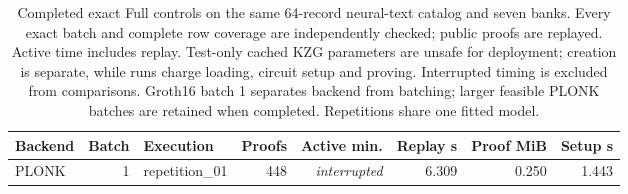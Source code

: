 \begin{table}[tbp]
\centering
\caption{Completed exact Full controls on the same 64-record neural-text catalog and seven banks. Every exact batch and complete row coverage are independently checked; public proofs are replayed. Active time includes replay. Test-only cached KZG parameters are unsafe for deployment; creation is separate, while runs charge loading, circuit setup and proving. Interrupted timing is excluded from comparisons. Groth16 batch 1 separates backend from batching; larger feasible PLONK batches are retained when completed. Repetitions share one fitted model.}
\label{tab:review-backend}
\begin{adjustbox}{max width=.98\textwidth,center=\textwidth}
\begin{tabular}{lrlrrrrr}
\toprule
Backend & Batch & Execution & Proofs & Active min. & Replay s & Proof MiB & Setup s\\
\midrule
PLONK & 1 & repetition\_01 & 448 & \emph{interrupted} & 6.309 & 0.250 & 1.443\\
\bottomrule
\end{tabular}
\end{adjustbox}
\end{table}
